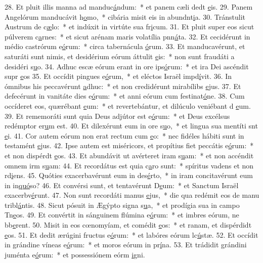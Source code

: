 28. Et pluit illis manna ad manduc\uline{á}ndum:~* et panem cæli dedt \uline{e}is.
29. Panem Angelórum manducávit h\uline{o}mo,~* cibária misit eis in abundnt\uline{i}a.
30. Tránstulit Austrum de c\uline{æ}lo:~* et indúxit in virtúte sua fr\uline{i}cum.
31. Et pluit super eos sicut púlverem c\uline{a}rnes:~* et sicut arénam maris volatília pnn\uline{á}ta.
32. Et cecidérunt in médio castrórum e\uline{ó}rum:~* circa tabernácula \uline{ó}rum.
33. Et manducavérunt, et saturáti sunt nimis, et desidérium eórum áttulit \uline{e}is:~* non sunt fraudáti a desidéri s\uline{u}o.
34. Adhuc escæ eórum erant in ore ips\uline{ó}rum:~* et ira Dei ascéndit supr \uline{e}os
35. Et occídit pingues e\uline{ó}rum,~* et eléctos Israël impd\uline{í}vit.
36. In ómnibus his peccavérunt \uline{a}dhuc:~* et non credidérunt mirabílibs \uline{e}jus.
37. Et defecérunt in vanitáte dies e\uline{ó}rum:~* et anni eórum cum festinat\uline{ó}ne.
38. Cum occíderet eos, quærébant \uline{e}um:~* et revertebántur, et dilúculo veniébant d \uline{e}um.
39. Et rememoráti sunt quia Deus adjútor est e\uline{ó}rum:~* et Deus excélsus redémptor er\uline{u}m est.
40. Et dilexérunt eum in ore s\uline{u}o,~* et lingua sua mentíti snt \uline{e}i.
41. Cor autem eórum non erat rectum cum \uline{e}o:~* nec fidéles hábiti sunt in testamént \uline{e}jus.
42. Ipse autem est miséricors, et propítius fiet peccátis e\uline{ó}rum:~* et non dispérdt \uline{e}os.
43. Et abundávit ut avérteret iram s\uline{u}am:~* et non accéndit omnem irm s\uline{u}am:
44. Et recordátus est quia c\uline{a}ro sunt:~* spíritus vadens et non rd\uline{i}ens.
45. Quóties exacerbavérunt eum in des\uline{é}rto,~* in iram concitavérunt eum in in\uline{quó}so?
46. Et convérsi sunt, et tentavérunt D\uline{e}um:~* et Sanctum Israël exacerbv\uline{é}runt.
47. Non sunt recordáti manus \uline{e}jus,~* die qua redémit eos de manu tribl\uline{á}ntis.
48. Sicut pósuit in Ægýpto signa s\uline{u}a,~* et prodígia sua in campo Tn\uline{e}os.
49. Et convértit in sánguinem flúmina e\uline{ó}rum:~* et imbres eórum, ne bb\uline{e}rent.
50. Misit in eos cœnomyíam, et comédit \uline{e}os:~* et ranam, et dispérdidt \uline{e}os.
51. Et dedit ærúgini fructus e\uline{ó}rum:~* et labóres eórum lc\uline{ú}stæ.
52. Et occídit in grándine víneas e\uline{ó}rum:~* et moros eórum in pr\uline{í}na.
53. Et trádidit grándini juménta e\uline{ó}rum:~* et possessiónem eórm \uline{i}gni.
